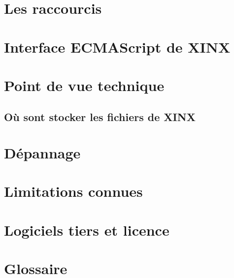 \documentclass[a4paper,10pt,twoside]{book}
\begin{document}
\appendix
\chapter{Les raccourcis}

\chapter{Interface ECMAScript de XINX}

\chapter{Point de vue technique}

\section{Où sont stocker les fichiers de XINX}

\chapter{Dépannage}

\chapter{Limitations connues}

\chapter{Logiciels tiers et licence}

\chapter{Glossaire}
\end{document}
